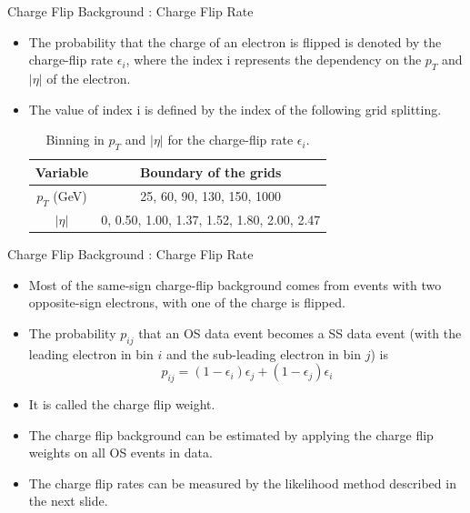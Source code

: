 \documentclass[mathserif,serif]{beamer}
\begin{document}
\begin{frame}{Charge Flip Background : Charge Flip Rate}
\begin{itemize}
\item The probability that the charge of an electron is flipped is denoted by the charge-flip rate $\epsilon_i$, where the index i represents the dependency on the $p_T$ and $|\eta|$ of the electron.
\item The value of index i is defined by the index of the following grid splitting.

\begin{table}[htbp]
\centering
\begin{tabular}{|c|c|}
\hline
Variable & Boundary of the grids \\
\hline
$p_T$ (GeV) &  25, 60, 90, 130, 150, 1000 \\
\hline
$|\eta|$ & 0, 0.50, 1.00, 1.37, 1.52, 1.80, 2.00, 2.47 \\
\hline
\end{tabular}
\caption{Binning in $p_T$ and $|\eta|$ for the charge-flip rate $\epsilon_i$.}
\end{table}

\end{itemize}

\end{frame}

\begin{frame}{Charge Flip Background : Charge Flip Rate}
\begin{itemize}
\item Most of the same-sign charge-flip background comes from events with two opposite-sign electrons, with one of the charge is flipped.
\item The probability $p_{ij}$ that an OS data event becomes a SS data event (with the leading electron in bin $i$ and the sub-leading electron in bin $j$) is
\begin{equation*}
p_{ij} = (1 - \epsilon_i)\epsilon_j + (1 - \epsilon_j)\epsilon_i
\end{equation*}
\item It is called the charge flip weight.
\item The charge flip background can be estimated by applying the charge flip weights on all OS events in data.
\item The charge flip rates can be measured by the likelihood method described in the next slide.
\end{itemize}
\end{frame}
\end{document}
